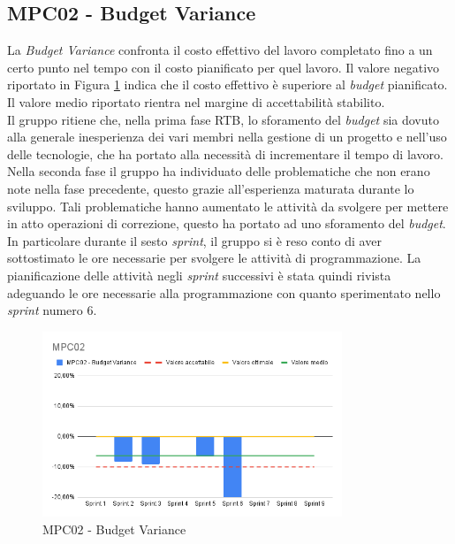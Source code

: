 \subsection{MPC02 - Budget Variance}
\label{s:mpc02}
La \textit{Budget Variance} confronta il costo effettivo del lavoro completato fino a un certo punto nel tempo con il costo pianificato per quel lavoro.
Il valore negativo riportato in Figura \ref{fig:mpc02} indica che il costo effettivo è superiore al \textit{budget} pianificato.
Il valore medio riportato rientra nel margine di accettabilità stabilito. \\
Il gruppo ritiene che, nella prima fase RTB, lo sforamento del \textit{budget} sia dovuto alla generale inesperienza dei vari membri nella gestione di un progetto e nell'uso delle tecnologie, che ha portato alla necessità di incrementare il tempo di lavoro.\\
Nella seconda fase il gruppo ha individuato delle problematiche che non erano note nella fase precedente, questo grazie all'esperienza maturata durante lo sviluppo.
Tali problematiche hanno aumentato le attività da svolgere per mettere in atto operazioni di correzione, questo ha portato ad uno sforamento del \textit{budget}.
In particolare durante il sesto \textit{sprint}, il gruppo si è reso conto di aver sottostimato le ore necessarie per svolgere le attività di programmazione.
La pianificazione delle attività negli \textit{sprint} successivi è stata quindi rivista adeguando le ore necessarie alla programmazione con quanto sperimentato nello \textit{sprint} numero 6.

\begin{figure}[ht]
    \centering
    \includegraphics[width=0.8\textwidth]{img/MPC02.png}
    \caption{MPC02 - Budget Variance}
    \label{fig:mpc02}
\end{figure}

\newpage


